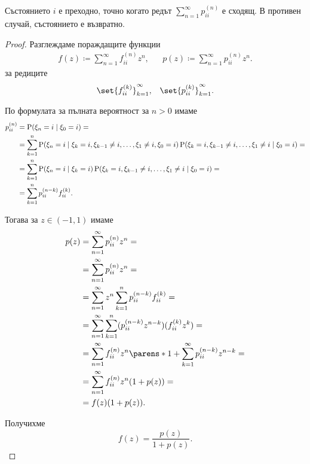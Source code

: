 \documentclass{../../common/topic}
\begin{document}
\begin{theorem}\label{thm:state_is_transient_iff_p_is_divergent}
  Състоянието \( i \) е преходно, точно когато редът \( \sum_{n=1}^\infty p^{(n)}_{ii} \) е сходящ. В противен случай, състоянието е възвратно.
\end{theorem}
\begin{proof}
  Разглеждаме пораждащите функции
  \begin{align*}
    f(z) \coloneqq \sum_{n=1}^\infty f_{ii}^{(n)} z^n,
    &&
    p(z) \coloneqq \sum_{n=1}^\infty p_{ii}^{(n)} z^n.
  \end{align*}
  за редиците
  \begin{align*}
    \set{ f_{ii}^{(k)} }_{k=1}^\infty,
    &&
    \set{ p_{ii}^{(k)} }_{k=1}^\infty.
  \end{align*}

  По формулата за пълната вероятност за \( n > 0 \) имаме
  \small{
  \begin{align*}
    p_{ii}^{(n)}
    &=
    \operatorname{P}(\xi_n = i \mid \xi_0 = i)
    = \\ &=
    \sum_{k=1}^n \operatorname{P}(\xi_n = i \mid \xi_k = i, \xi_{k-1} \neq i, \ldots, \xi_1 \neq i, \xi_0 = i) \operatorname{P}(\xi_k = i, \xi_{k-1} \neq i, \ldots, \xi_1 \neq i \mid \xi_0 = i)
    = \\ &=
    \sum_{k=1}^n \operatorname{P}(\xi_n = i \mid \xi_k = i) \operatorname{P}(\xi_k = i, \xi_{k-1} \neq i, \ldots, \xi_1 \neq i \mid \xi_0 = i)
    = \\ &=
    \sum_{k=1}^n p_{ii}^{(n-k)} f_{ii}^{(k)}.
  \end{align*}
  }

  Тогава за \( z \in (-1, 1) \) имаме
  \begin{align*}
    p(z)
    &=
    \sum_{n=1}^\infty p_{ii}^{(n)} z^n
    = \\ &=
    \sum_{n=1}^\infty p_{ii}^{(n)} z^n
    = \\ &=
    \sum_{n=1}^\infty z^n \sum_{k=1}^n p_{ii}^{(n-k)} f_{ii}^{(k)}
    = \\ &=
    \sum_{n=1}^\infty \sum_{k=1}^n (p_{ii}^{(n-k)} z^{n-k}) (f_{ii}^{(k)} z^k)
    = \\ &=
    \sum_{n=1}^\infty f_{ii}^{(n)} z^n \parens*{ 1 + \sum_{k=1}^\infty p_{ii}^{(n-k)} z^{n-k} }
    = \\ &=
    \sum_{n=1}^\infty f_{ii}^{(n)} z^n (1 + p(z))
    = \\ &=
    f(z) (1 + p(z)).
  \end{align*}

  Получихме
  \begin{equation*}
    f(z) = \frac {p(z)} {1 + p(z)}.
  \end{equation*}


\end{proof}
\end{document}
